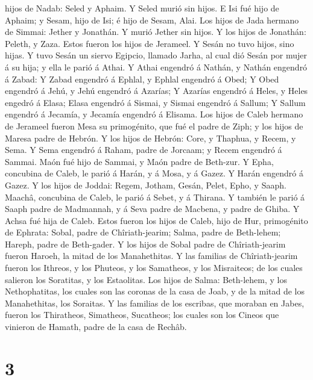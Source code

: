 hijos de Nadab: Seled y Aphaim. Y Seled murió sin hijos.  E
Isi fué hijo de Aphaim; y Sesam, hijo de Isi; é hijo de Sesam, Alai.
 Los hijos de Jada hermano de Simmai: Jether y Jonathán. Y
murió Jether sin hijos.  Y los hijos de Jonathán: Peleth, y
Zaza. Estos fueron los hijos de Jerameel.  Y Sesán no tuvo
hijos, sino hijas.  Y tuvo Sesán un siervo Egipcio, llamado
Jarha, al cual dió Sesán por mujer á su hija; y ella le parió á Athai.
 Y Athai engendró á Nathán, y Nathán engendró á Zabad:
 Y Zabad engendró á Ephlal, y Ephlal engendró á Obed;
 Y Obed engendró á Jehú, y Jehú engendró á Azarías;
 Y Azarías engendró á Heles, y Heles engedró á Elasa;
 Elasa engendró á Sismai, y Sismai engendró á Sallum;
 Y Sallum engendró á Jecamía, y Jecamía engendró á Elisama.
 Los hijos de Caleb hermano de Jerameel fueron Mesa su
primogénito, que fué el padre de Ziph; y los hijos de Maresa padre de
Hebrón.  Y los hijos de Hebrón: Core, y Thaphua, y Recem, y
Sema.  Y Sema engendró á Raham, padre de Jorcaam; y Recem
engendró á Sammai.  Maón fué hijo de Sammai, y Maón padre
de Beth-zur.  Y Epha, concubina de Caleb, le parió á Harán,
y á Mosa, y á Gazez. Y Harán engendró á Gazez.  Y los hijos
de Joddai: Regem, Jotham, Gesán, Pelet, Epho, y Saaph. 
Maachâ, concubina de Caleb, le parió á Sebet, y á Thirana. 
Y también le parió á Saaph padre de Madmannah, y á Seva padre de
Macbena, y padre de Ghiba. Y Achsa fué hija de Caleb. 
Estos fueron los hijos de Caleb, hijo de Hur, primogénito de Ephrata:
Sobal, padre de Chîriath-jearim;  Salma, padre de
Beth-lehem; Hareph, padre de Beth-gader.  Y los hijos de
Sobal padre de Chîriath-jearim fueron Haroeh, la mitad de los
Manahethitas.  Y las familias de Chîriath-jearim fueron los
Ithreos, y los Phuteos, y los Samatheos, y los Misraiteos; de los cuales
salieron los Soratitas, y los Estaolitas.  Los hijos de
Salma: Beth-lehem, y los Nethophatitas, los cuales son las coronas de la
casa de Joab, y de la mitad de los Manahethitas, los Soraitas.
 Y las familias de los escribas, que moraban en Jabes,
fueron los Thiratheos, Simatheos, Sucatheos; los cuales son los Cineos
que vinieron de Hamath, padre de la casa de Rechâb.

\hypertarget{section-2}{%
\section{3}\label{section-2}}

